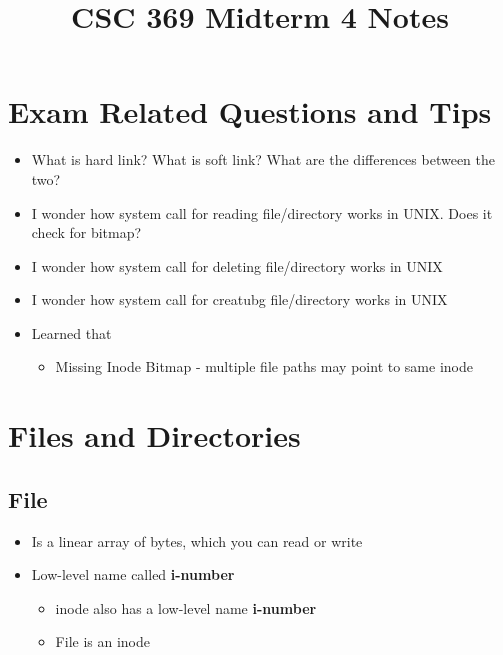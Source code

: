 \documentclass[12pt]{article}
\begin{document}
\title{CSC 369 Midterm 4 Notes}

\section{Exam Related Questions and Tips}

\begin{itemize}
    \item What is hard link? What is soft link? What are the differences between the two?
    \item I wonder how system call for reading file/directory works in UNIX. Does it check for bitmap?
    \item I wonder how system call for deleting file/directory works in UNIX
    \item I wonder how system call for creatubg file/directory works in UNIX
    \item Learned that
    \begin{itemize}
        \item Missing Inode Bitmap - multiple file paths may point to same inode
    \end{itemize}
\end{itemize}

\section{Files and Directories}
\subsection{File}
\begin{itemize}
    \item Is a linear array of bytes, which you can read or write
    \item Low-level name called \textbf{i-number}
    \begin{itemize}
        \item inode also has a low-level name \textbf{i-number}
        \item File is an inode
    \end{itemize}
\end{itemize}
\end{document}
